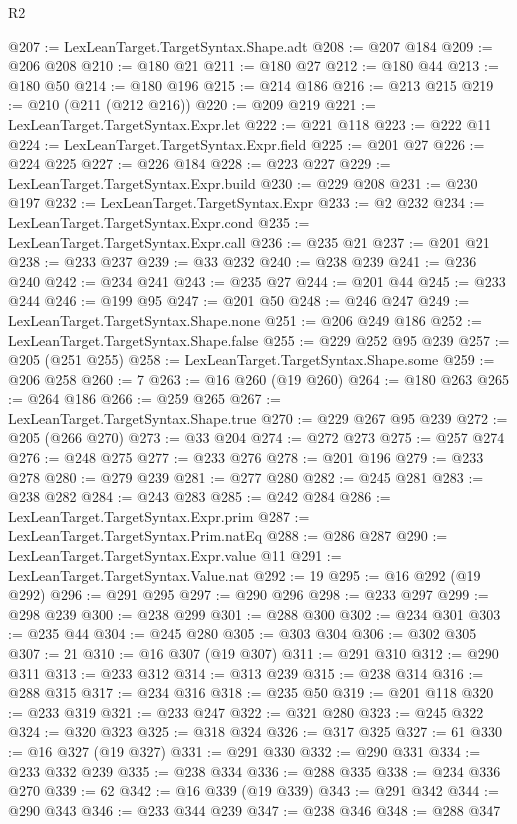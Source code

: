 \begin{lexlean}{R2}
\begin{coremodule}
@207 := LexLeanTarget.TargetSyntax.Shape.adt
@208 := @207 @184
@209 := @206 @208
@210 := @180 @21
@211 := @180 @27
@212 := @180 @44
@213 := @180 @50
@214 := @180 @196
@215 := @214 @186
@216 := @213 @215
@219 := @210 (@211 (@212 @216))
@220 := @209 @219
@221 := LexLeanTarget.TargetSyntax.Expr.let
@222 := @221 @118
@223 := @222 @11
@224 := LexLeanTarget.TargetSyntax.Expr.field
@225 := @201 @27
@226 := @224 @225
@227 := @226 @184
@228 := @223 @227
@229 := LexLeanTarget.TargetSyntax.Expr.build
@230 := @229 @208
@231 := @230 @197
@232 := LexLeanTarget.TargetSyntax.Expr
@233 := @2 @232
@234 := LexLeanTarget.TargetSyntax.Expr.cond
@235 := LexLeanTarget.TargetSyntax.Expr.call
@236 := @235 @21
@237 := @201 @21
@238 := @233 @237
@239 := @33 @232
@240 := @238 @239
@241 := @236 @240
@242 := @234 @241
@243 := @235 @27
@244 := @201 @44
@245 := @233 @244
@246 := @199 @95
@247 := @201 @50
@248 := @246 @247
@249 := LexLeanTarget.TargetSyntax.Shape.none
@251 := @206 @249 @186
@252 := LexLeanTarget.TargetSyntax.Shape.false
@255 := @229 @252 @95 @239
@257 := @205 (@251 @255)
@258 := LexLeanTarget.TargetSyntax.Shape.some
@259 := @206 @258
@260 := 7
@263 := @16 @260 (@19 @260)
@264 := @180 @263
@265 := @264 @186
@266 := @259 @265
@267 := LexLeanTarget.TargetSyntax.Shape.true
@270 := @229 @267 @95 @239
@272 := @205 (@266 @270)
@273 := @33 @204
@274 := @272 @273
@275 := @257 @274
@276 := @248 @275
@277 := @233 @276
@278 := @201 @196
@279 := @233 @278
@280 := @279 @239
@281 := @277 @280
@282 := @245 @281
@283 := @238 @282
@284 := @243 @283
@285 := @242 @284
@286 := LexLeanTarget.TargetSyntax.Expr.prim
@287 := LexLeanTarget.TargetSyntax.Prim.natEq
@288 := @286 @287
@290 := LexLeanTarget.TargetSyntax.Expr.value @11
@291 := LexLeanTarget.TargetSyntax.Value.nat
@292 := 19
@295 := @16 @292 (@19 @292)
@296 := @291 @295
@297 := @290 @296
@298 := @233 @297
@299 := @298 @239
@300 := @238 @299
@301 := @288 @300
@302 := @234 @301
@303 := @235 @44
@304 := @245 @280
@305 := @303 @304
@306 := @302 @305
@307 := 21
@310 := @16 @307 (@19 @307)
@311 := @291 @310
@312 := @290 @311
@313 := @233 @312
@314 := @313 @239
@315 := @238 @314
@316 := @288 @315
@317 := @234 @316
@318 := @235 @50
@319 := @201 @118
@320 := @233 @319
@321 := @233 @247
@322 := @321 @280
@323 := @245 @322
@324 := @320 @323
@325 := @318 @324
@326 := @317 @325
@327 := 61
@330 := @16 @327 (@19 @327)
@331 := @291 @330
@332 := @290 @331
@334 := @233 @332 @239
@335 := @238 @334
@336 := @288 @335
@338 := @234 @336 @270
@339 := 62
@342 := @16 @339 (@19 @339)
@343 := @291 @342
@344 := @290 @343
@346 := @233 @344 @239
@347 := @238 @346
@348 := @288 @347

\end{coremodule}
\end{lexlean}
